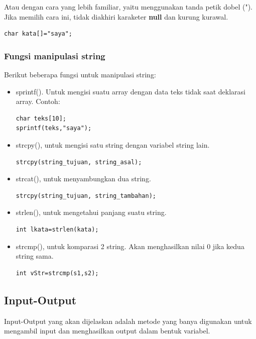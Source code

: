 \documentclass[12pt,]{article}
\begin{document}
	Atau dengan cara yang lebih familiar, yaitu menggunakan tanda petik dobel (").
	Jika memilih cara ini, tidak diakhiri karaketer \textbf{null} dan kurung kurawal.
	\begin{verbatim}
char kata[]="saya";
	\end{verbatim}
	
	\subsubsection{Fungsi manipulasi string}
	Berikut beberapa fungsi untuk manipulasi string:
	\begin{itemize}
		\item sprintf(). Untuk mengisi suatu array dengan data teks tidak saat deklarasi array.
		Contoh:
		\begin{verbatim}
char teks[10];
sprintf(teks,"saya");
		\end{verbatim}
		
		\item strcpy(), untuk mengisi satu string dengan variabel string lain.
		\begin{verbatim}
strcpy(string_tujuan, string_asal);
		\end{verbatim}
		
		\item strcat(), untuk menyambungkan dua string.
		\begin{verbatim}
strcpy(string_tujuan, string_tambahan);
		\end{verbatim}
		
		\item strlen(), untuk mengetahui panjang suatu string.
		\begin{verbatim}
int lkata=strlen(kata);
		\end{verbatim}
		
		\item strcmp(), untuk komparasi 2 string.
		Akan menghasilkan nilai 0 jika kedua string sama.
		\begin{verbatim}
int vStr=strcmp(s1,s2);
		\end{verbatim}
	\end{itemize}
	
	\newpage
	\subsection{Input-Output}
	Input-Output yang akan dijelaskan adalah metode yang banya digunakan untuk mengambil input dan menghasilkan output dalam bentuk variabel.
		
\end{document}
